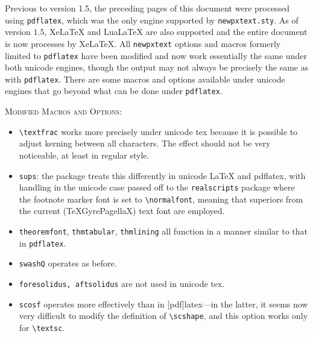 \documentclass[11pt]{article}
\theoremstyle{oldplain}
\theoremstyle{plain}
\begin{document}
Previous to version 1.5, the preceding pages of this document were processed using {\tt pdflatex}, which was the only engine supported by {\tt newpxtext.sty}. As of version $1.5$, XeLaTeX and LuaLaTeX are also supported and the entire document is now processes by XeLaTeX. All {\tt newpxtext} options and macros formerly limited to {\tt pdflatex} have been modified and now work essentially the same under both unicode engines, though the output may not always be precisely the same as with {\tt pdflatex}. There are some macros and options available under unicode engines that go beyond what can be done under {\tt pdflatex}.

\textsc{Modified Macros and Options:}
\begin{itemize}
\item
\verb|\textfrac| works more precisely under unicode tex because it is possible to adjust kerning between all characters. The effect should not be very noticeable, at least in regular style. 
\item {\tt sups}:  the package treats this differently in unicode LaTeX and pdflatex, with handling in the unicode case passed off to the {\tt realscripts} package where the footnote marker font is set to \verb|\normalfont|, meaning that superiors from the current (TeXGyrePagellaX) text font are employed.
\item {\tt theoremfont}, {\tt thmtabular}, {\tt thmlining} all function in a manner similar to that in {\tt pdflatex}.
\item {\tt swashQ} operates as before.
\item {\tt foresolidus, aftsolidus} are not used in unicode tex.
\item {\tt scosf} operates more effectively than in [pdf]latex---in the latter, it seems now very difficult to modify the definition of \verb|\scshape|, and this option works only for \verb|\textsc|.


\end{itemize}
\end{document}
